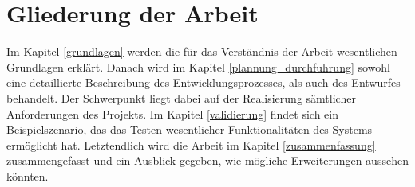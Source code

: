\section{Gliederung der Arbeit}
Im Kapitel \ref{grundlagen} werden die für das Verständnis der Arbeit wesentlichen Grundlagen erklärt. Danach wird im Kapitel \ref{plannung_durchfuhrung} sowohl eine detaillierte Beschreibung des Entwicklungsprozesses, als auch des Entwurfes behandelt. Der Schwerpunkt liegt dabei auf der Realisierung sämtlicher Anforderungen des Projekts. Im Kapitel \ref{validierung} findet sich ein Beispielszenario, das das Testen wesentlicher Funktionalitäten des Systems ermöglicht hat. Letztendlich wird die Arbeit im Kapitel \ref{zusammenfassung} zusammengefasst und ein Ausblick gegeben, wie mögliche Erweiterungen aussehen könnten.
